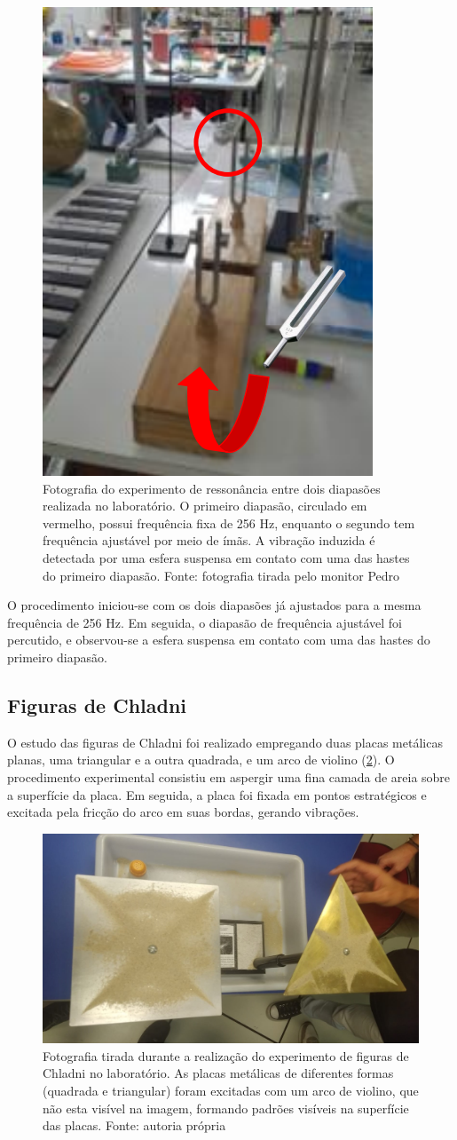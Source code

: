 \begin{figure}[H]
    \centering
    \includegraphics[width=0.35\linewidth]{fig/ressonacia.png}
    \caption{Fotografia do experimento de ressonância entre dois diapasões realizada no laboratório. O primeiro diapasão, circulado em vermelho, possui frequência fixa de 256 Hz, enquanto o segundo tem frequência ajustável por meio de ímãs. A vibração induzida é detectada por uma esfera suspensa em contato com uma das hastes do primeiro diapasão. Fonte: fotografia tirada pelo monitor Pedro}
    \label{fig:ressonancia}
\end{figure}

O procedimento iniciou-se com os dois diapasões já ajustados para a mesma frequência de 256 Hz. Em seguida, o diapasão de frequência ajustável foi percutido, e observou-se a esfera suspensa em contato com uma das hastes do primeiro diapasão. 

\subsection{Figuras de Chladni}
O estudo das figuras de Chladni foi realizado empregando duas placas metálicas planas, uma triangular e a outra quadrada, e um arco de violino (\cref{fig:chladni}). O procedimento experimental consistiu em aspergir uma fina camada de areia sobre a superfície da placa. Em seguida, a placa foi fixada em pontos estratégicos e excitada pela fricção do arco em suas bordas, gerando vibrações.

\begin{figure}[H]
    \centering
    \includegraphics[width=0.35\linewidth]{fig/chladni.png.jpg}
    \caption{Fotografia tirada durante a realização do experimento de figuras de Chladni no laboratório. As placas metálicas de diferentes formas (quadrada e triangular) foram excitadas com um arco de violino, que não esta visível na imagem, formando padrões visíveis na superfície das placas. Fonte: autoria própria}
    \label{fig:chladni}
\end{figure}


